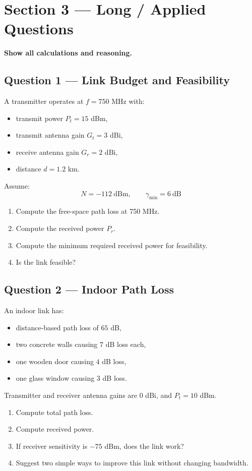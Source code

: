 \documentclass[11pt,a4paper]{article}
\begin{document}
\newpage
\section*{Section 3 --- Long / Applied Questions}
\textbf{Show all calculations and reasoning.}

\subsection*{Question 1 --- Link Budget and Feasibility}
A transmitter operates at $f = 750$ MHz with:
\begin{itemize}[leftmargin=1.2cm]
    \item transmit power $P_t = 15$ dBm,
    \item transmit antenna gain $G_t = 3$ dBi,
    \item receive antenna gain $G_r = 2$ dBi,
    \item distance $d = 1.2$ km.
\end{itemize}

Assume:
\[
N = -112\ \mathrm{dBm}, \qquad \gamma_{\min} = 6\ \mathrm{dB}
\]

\begin{enumerate}[label=\alph*)]
    \item Compute the free-space path loss at 750 MHz.
    \item Compute the received power $P_r$.
    \item Compute the minimum required received power for feasibility.
    \item Is the link feasible?
\end{enumerate}

\subsection*{Question 2 --- Indoor Path Loss}
An indoor link has:
\begin{itemize}[leftmargin=1.2cm]
    \item distance-based path loss of $65$ dB,
    \item two concrete walls causing $7$ dB loss each,
    \item one wooden door causing $4$ dB loss,
    \item one glass window causing $3$ dB loss.
    \end{itemize}

Transmitter and receiver antenna gains are $0$ dBi, and $P_t = 10$ dBm.

\begin{enumerate}[label=\alph*)]
    \item Compute total path loss.
    \item Compute received power.
    \item If receiver sensitivity is $-75$ dBm, does the link work?
    \item Suggest two simple ways to improve this link without changing bandwidth.
\end{enumerate}
\end{document}
